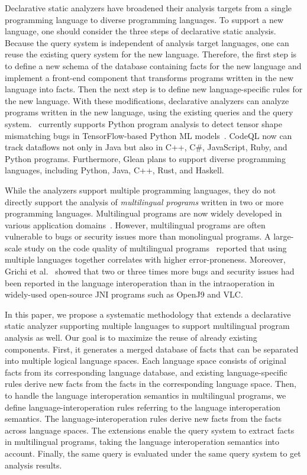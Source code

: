 Declarative static analyzers have broadened their analysis targets from a
single programming language to diverse programming languages.  To support a new
language, one should consider the three steps of declarative static analysis.
Because the query system is independent of analysis target languages, one can
reuse the existing query system for the new language. Therefore, the first step
is to define a new schema of the database containing facts for the new language
and implement a front-end component that transforms programs written in the new
language into facts.  Then the next step is to define new language-specific
rules for the new language.  With these modifications, declarative analyzers
can analyze programs written in the new language, using the existing queries
and the query system.  \doop~currently supports Python program analysis to
detect tensor shape mismatching bugs in TensorFlow-based Python ML
models~\cite{lagouvardos2020static}.  CodeQL now can track dataflows not only
in Java but also in C++, C\#, JavaScript, Ruby, and Python programs.
Furthermore, Glean plans to support diverse programming languages, including
Python, Java, C++, Rust, and Haskell.

While the analyzers support multiple programming languages, they do not
directly support the analysis of \textit{multilingual programs} written in two
or more programming languages.  Multilingual programs are now widely developed
in various application domains~\cite{kochhar2016large, mergendahlcross}.
However, multilingual programs are often vulnerable to bugs or security issues
more than monolingual programs. A large-scale study on the code quality of
multilingual programs~\cite{kochhar2016large} reported that using multiple
languages together correlates with higher error-proneness. Moreover, Grichi et
al.~\cite{grichi2020impact} showed that two or three times more bugs and
security issues had been reported in the language interoperation than in the
intraoperation in widely-used open-source JNI programs such as OpenJ9 and VLC.

In this paper, we propose a systematic methodology that extends a declarative
static analyzer supporting multiple languages to support multilingual program
analysis as well. Our goal is to maximize the reuse of already existing
components. First, it generates a merged database of facts that can be
separated into multiple logical language spaces.  Each language space consists
of original facts from its corresponding language database, and existing
language-specific rules derive new facts from the facts in the corresponding
language space. Then, to handle the language interoperation semantics in
multilingual programs, we define language-interoperation rules referring to the
language interoperation semantics. The language-interoperation rules derive new
facts from the facts across language spaces. The extensions enable the query
system to extract facts in multilingual programs, taking the language
interoperation semantics into account.  Finally, the same query is evaluated
under the same query system to get analysis results.

